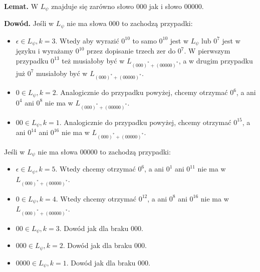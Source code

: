 \documentclass[a4paper]{article}
\begin{document}
\begin{enumerate}
\begin{itemize}
\textbf{Lemat.} W $L_{\psi}$ znajduje się zarówno słowo $000$ jak i słowo $00000$. 

\textbf{Dowód.} Jeśli w $L_{\psi}$ nie ma słowa $000$ to zachodzą przypadki:
\begin{itemize}
\item $\epsilon \in L_{\psi}, k = 3$. Wtedy aby wyrazić $0^{10}$ to samo $0^{10}$ jest w $L_{\psi}$ lub $0^7$ jest w języku i wyrażamy $0^{10}$ przez dopisanie trzech zer do $0^7$. W pierwszym przypadku $0^{13}$ też musiałoby być w $L_{(000)^* + (00000)^*}$, a w drugim przypadku już $0^7$ musiałoby być w $L_{(000)^* + (00000)^*}$.
\item $0 \in L_{\psi}, k = 2$. Analogicznie do przypadku powyżej, chcemy otrzymać $0^6$, a ani $0^4$ ani $0^8$ nie ma w $L_{(000)^* + (00000)^*}$.
\item $00 \in L_{\psi}, k = 1$. Analogicznie do przypadku powyżej, chcemy otrzymać $0^{15}$, a ani $0^{14}$ ani $0^{16}$ nie ma w $L_{(000)^* + (00000)^*}$.
\end{itemize}

Jeśli w $L_{\psi}$ nie ma słowa $00000$ to zachodzą przypadki:
\begin{itemize}
\item $\epsilon \in L_{\psi}, k = 5$. Wtedy chcemy otrzymać $0^6$, a ani $0^1$ ani $0^{11}$ nie ma w $L_{(000)^* + (00000)^*}$.
\item $0 \in L_{\psi}, k = 4$. Wtedy chcemy otrzymać $0^{12}$, a ani $0^8$ ani $0^{16}$ nie ma w $L_{(000)^* + (00000)^*}$.
\item $00 \in L_{\psi}, k = 3$. Dowód jak dla braku $000$.
\item $000 \in L_{\psi}, k = 2$. Dowód jak dla braku $000$.
\item $0000 \in L_{\psi}, k = 1$. Dowód jak dla braku $000$.
\end{itemize}
\vspace{1cm}


\end{itemize}
\end{enumerate}
\end{document}
